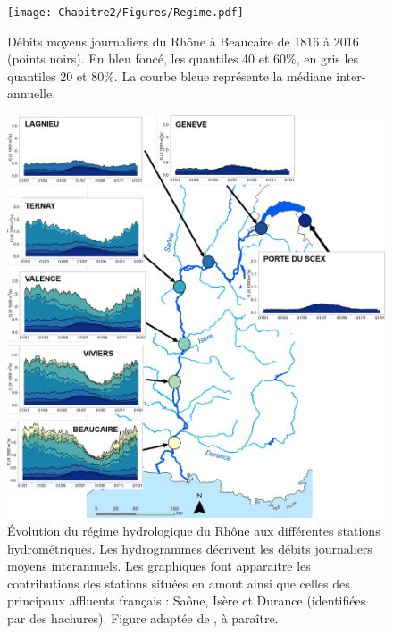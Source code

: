 	\begin{figure}[h!]
	\centering
		\texttt{[image: Chapitre2/Figures/Regime.pdf]}
        \caption{Débits moyens journaliers du Rhône à Beaucaire de 1816 à 2016 (points noirs). En bleu foncé, les quantiles 40 et 60\%, en gris les quantiles 20 et 80\%. La courbe bleue représente la médiane inter-annuelle.}	
		\label{fig:Regime}
	\end{figure}
	
	\begin{figure}[h!]
	\centering
		\includegraphics[width=.6\linewidth]{Chapitre2/Figures/RégimeRhône.pdf}
        \caption{Évolution du régime hydrologique du Rhône aux différentes stations hydrométriques. Les hydrogrammes décrivent les débits journaliers moyens interannuels. Les graphiques font apparaitre les contributions des stations situées en amont ainsi que celles des principaux affluents français : Saône, Isère et Durance (identifiées par des hachures). Figure adaptée de \cite{le_coz_flux_2023}, à paraître.}	
		\label{fig:RegimeAffluents}
	\end{figure}

